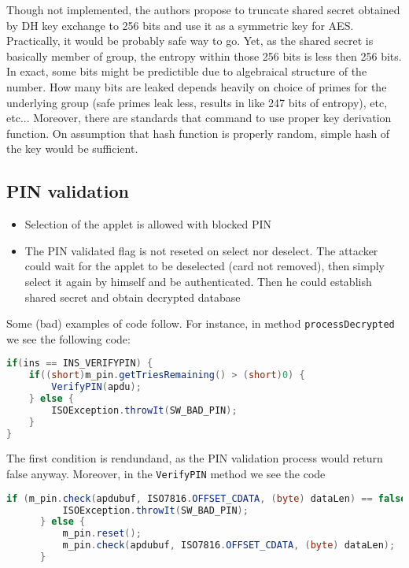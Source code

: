 \documentclass[11pt,a4paper]{article}
\begin{document}
Though not implemented, the authors propose to truncate shared secret obtained by DH key exchange to 256 bits and use it as a symmetric key for AES. Practically, it would be probably safe way to go. Yet, 
as the shared secret is basically member of group, the entropy within those 256 bits is less then 256 bits. In exact, some bits might be predictible due to algebraical structure of the number. How many bits are leaked depends heavily on choice of primes for the underlying group (safe primes leak less, results in like 247 bits of entropy), etc, etc... Moreover, there are standards that command to use proper key derivation function. On assumption that hash function is properly random, simple hash of the key would be sufficient.

\subsection*{PIN validation}

\begin{itemize}
	\item Selection of the applet is allowed with blocked PIN
	\item The PIN validated flag is not reseted on select nor deselect. The attacker could wait for the applet to be deselected (card not removed), then simply select it again by himself and be authenticated. Then he could establish shared secret and obtain decrypted database
\end{itemize}

Some (bad) examples of code follow. For instance, in method \texttt{processDecrypted} we see the following code:

\begin{lstlisting}[language=java]
if(ins == INS_VERIFYPIN) {
	if((short)m_pin.getTriesRemaining() > (short)0) {
		VerifyPIN(apdu); 
	} else {
		ISOException.throwIt(SW_BAD_PIN);
	}
}
\end{lstlisting}

The first condition is rendundand, as the PIN validation process would return false anyway. Moreover, in the \texttt{VerifyPIN} method we see the code

\begin{lstlisting}[language=java]
if (m_pin.check(apdubuf, ISO7816.OFFSET_CDATA, (byte) dataLen) == false) { 
          ISOException.throwIt(SW_BAD_PIN);
      } else {
          m_pin.reset();
          m_pin.check(apdubuf, ISO7816.OFFSET_CDATA, (byte) dataLen);
      }
\end{lstlisting}
\end{document}
